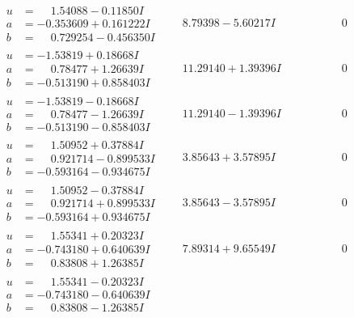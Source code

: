 \documentclass[1p]{elsarticle_modified}
\theoremstyle{definition}
\begin{document}
$$\begin{array}{c|c|c}
\begin{aligned}
u &= \phantom{-}1.54088 - 0.11850 I \\
a &= -0.353609 + 0.161222 I \\
b &= \phantom{-}0.729254 - 0.456350 I\end{aligned}
 & \phantom{-}8.79398 - 5.60217 I & \phantom{-0.000000 } 0 \\ \hline\begin{aligned}
u &= -1.53819 + 0.18668 I \\
a &= \phantom{-}0.78477 + 1.26639 I \\
b &= -0.513190 + 0.858403 I\end{aligned}
 & \phantom{-}11.29140 + 1.39396 I & \phantom{-0.000000 } 0 \\ \hline\begin{aligned}
u &= -1.53819 - 0.18668 I \\
a &= \phantom{-}0.78477 - 1.26639 I \\
b &= -0.513190 - 0.858403 I\end{aligned}
 & \phantom{-}11.29140 - 1.39396 I & \phantom{-0.000000 } 0 \\ \hline\begin{aligned}
u &= \phantom{-}1.50952 + 0.37884 I \\
a &= \phantom{-}0.921714 - 0.899533 I \\
b &= -0.593164 - 0.934675 I\end{aligned}
 & \phantom{-}3.85643 + 3.57895 I & \phantom{-0.000000 } 0 \\ \hline\begin{aligned}
u &= \phantom{-}1.50952 - 0.37884 I \\
a &= \phantom{-}0.921714 + 0.899533 I \\
b &= -0.593164 + 0.934675 I\end{aligned}
 & \phantom{-}3.85643 - 3.57895 I & \phantom{-0.000000 } 0 \\ \hline\begin{aligned}
u &= \phantom{-}1.55341 + 0.20323 I \\
a &= -0.743180 + 0.640639 I \\
b &= \phantom{-}0.83808 + 1.26385 I\end{aligned}
 & \phantom{-}7.89314 + 9.65549 I & \phantom{-0.000000 } 0 \\ \hline\begin{aligned}
u &= \phantom{-}1.55341 - 0.20323 I \\
a &= -0.743180 - 0.640639 I \\
b &= \phantom{-}0.83808 - 1.26385 I\end{aligned}

\end{array}$$
\end{document}

